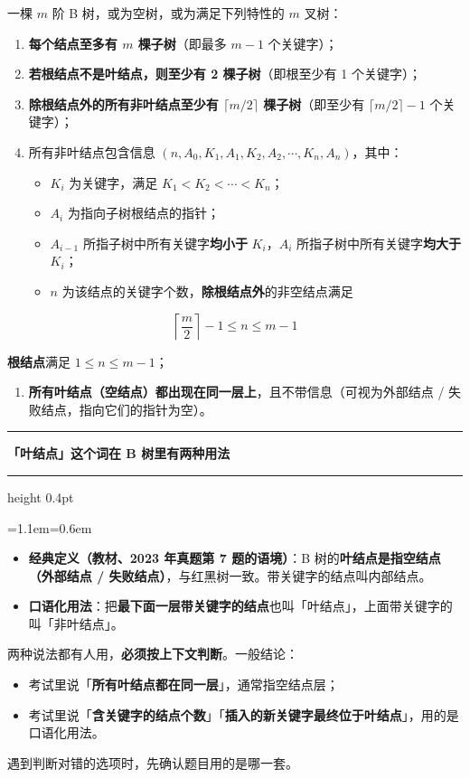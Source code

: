 \documentclass[11pt,openany,UTF8]{ctexbook}
\newcommand{\callouthead}[2]{%
  \par\addvspace{7pt}\noindent
  {\color{#1}\rule[-0.15em]{3pt}{1.05em}}\hspace{0.5em}%
  {\bfseries\color{#1}#2}\par\nobreak\vspace{-0.35em}%
  {\color{rulesep}\hrule height 0.4pt}\nobreak\vspace{0.45em}%
  \begingroup\small\setlength{\parindent}{0pt}%
  \leftskip=1.1em\rightskip=0.6em\noindent\ignorespaces}
\newcommand{\calloutend}{\par\endgroup\addvspace{7pt}}
\newenvironment{callwarn}[1]{\callouthead{warnbar}{#1}}{\calloutend}
\begin{document}
一棵 $m$ 阶 B 树，或为空树，或为满足下列特性的 $m$ 叉树：

\begin{enumerate}
\item \textbf{每个结点至多有 $m$ 棵子树}（即最多 $m-1$ 个关键字）；
\item \textbf{若根结点不是叶结点，则至少有 2 棵子树}（即根至少有 1 个关键字）；
\item \textbf{除根结点外的所有非叶结点至少有 $\lceil m/2\rceil$ 棵子树}（即至少有 $\lceil m/2\rceil-1$ 个关键字）；
\item 所有非叶结点包含信息 $(n,A_0,K_1,A_1,K_2,A_2,\cdots,K_n,A_n)$，其中：
\begin{itemize}
\item $K_i$ 为关键字，满足 $K_1<K_2<\cdots<K_n$；
\item $A_i$ 为指向子树根结点的指针；
\item $A_{i-1}$ 所指子树中所有关键字\textbf{均小于} $K_i$，$A_i$ 所指子树中所有关键字\textbf{均大于} $K_i$；
\item $n$ 为该结点的关键字个数，\textbf{除根结点外}的非空结点满足
\end{itemize}
\end{enumerate}
\[\left\lceil \frac{m}{2}\right\rceil-1\le n\le m-1\]

\textbf{根结点}满足 $1\le n\le m-1$；

\begin{enumerate}
\item \textbf{所有叶结点（空结点）都出现在同一层上}，且不带信息（可视为外部结点 / 失败结点，指向它们的指针为空）。
\end{enumerate}
\begin{callwarn}{「叶结点」这个词在 B 树里有两种用法}
\begin{itemize}
\item \textbf{经典定义（教材、2023 年真题第 7 题的语境）}：B 树的\textbf{叶结点是指空结点（外部结点 / 失败结点）}，与红黑树一致。带关键字的结点叫内部结点。
\item \textbf{口语化用法}：把\textbf{最下面一层带关键字的结点}也叫「叶结点」，上面带关键字的叫「非叶结点」。
\end{itemize}
两种说法都有人用，\textbf{必须按上下文判断}。一般结论：

\begin{itemize}
\item 考试里说「\textbf{所有叶结点都在同一层}」，通常指空结点层；
\item 考试里说「\textbf{含关键字的结点个数}」「\textbf{插入的新关键字最终位于叶结点}」，用的是口语化用法。
\end{itemize}
遇到判断对错的选项时，先确认题目用的是哪一套。

\end{callwarn}
\end{document}
